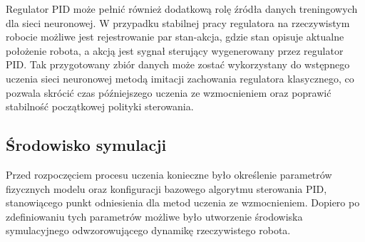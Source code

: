 \documentclass[12pt,twoside]{article}
\begin{document}
Regulator PID może pełnić również dodatkową rolę źródła danych treningowych dla sieci neuronowej. W przypadku stabilnej pracy regulatora na rzeczywistym robocie możliwe jest rejestrowanie par stan-akcja, gdzie stan opisuje aktualne położenie robota, a akcją jest sygnał sterujący wygenerowany przez regulator PID. Tak przygotowany zbiór danych może zostać wykorzystany do wstępnego uczenia sieci neuronowej metodą imitacji zachowania regulatora klasycznego, co pozwala skrócić czas późniejszego uczenia ze wzmocnieniem oraz poprawić stabilność początkowej polityki sterowania.

\subsection{Środowisko symulacji}
Przed rozpoczęciem procesu uczenia konieczne było określenie parametrów fizycznych modelu oraz konfiguracji bazowego algorytmu sterowania PID, stanowiącego punkt odniesienia dla metod uczenia ze wzmocnieniem. Dopiero po zdefiniowaniu tych parametrów możliwe było utworzenie środowiska symulacyjnego odwzorowującego dynamikę rzeczywistego robota.
\end{document}

